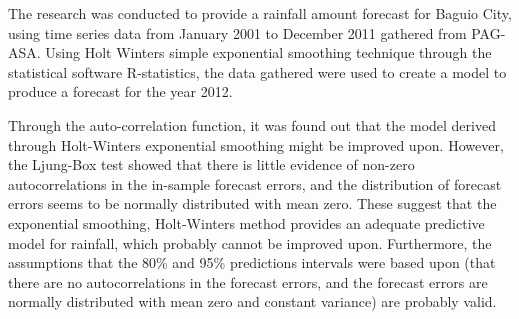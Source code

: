 The research was conducted to provide a rainfall amount forecast for Baguio City, using time series data from January 2001 to December 2011 gathered from PAG-ASA. 
Using Holt Winters simple exponential smoothing technique through the statistical software R-statistics, the data gathered were used to create a model to produce a forecast for the year 2012. 

Through the auto-correlation function, it was found out that the model derived through Holt-Winters exponential smoothing might be improved upon. However, the Ljung-Box test showed that there is little evidence of non-zero autocorrelations in the in-sample forecast
errors, and the distribution of forecast errors seems to be normally distributed with mean zero. These suggest
that the exponential smoothing, Holt-Winters method provides an adequate predictive model for  rainfall, which
probably cannot be improved upon. Furthermore, the assumptions that the 80\% and 95\% predictions intervals
were based upon (that there are no autocorrelations in the forecast errors, and the forecast errors are normally
distributed with mean zero and constant variance) are probably valid.